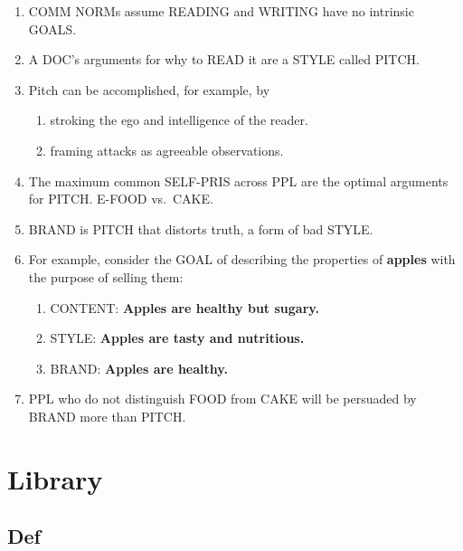 \documentclass[
]{book}
\providecommand{\tightlist}{%
  \setlength{\itemsep}{0pt}\setlength{\parskip}{0pt}}
\begin{document}
\begin{enumerate}
\def\labelenumi{\arabic{enumi}.}
\setcounter{enumi}{63}
\tightlist
\item
  COMM NORMs assume READING and WRITING have no intrinsic GOALS.
\item
  A DOC's arguments for why to READ it are a STYLE called PITCH.
\item
  Pitch can be accomplished, for example, by

  \begin{enumerate}
  \def\labelenumii{\arabic{enumii}.}
  \tightlist
  \item
    stroking the ego and intelligence of the reader.
  \item
    framing attacks as agreeable observations.
  \end{enumerate}
\item
  The maximum common SELF-PRIS across PPL are the optimal
  arguments for PITCH. E-FOOD vs.~CAKE.
\item
  BRAND is PITCH that distorts truth, a form of bad STYLE.
\item
  For example, consider the GOAL of describing the properties of \textbf{apples } with the purpose of selling them:

  \begin{enumerate}
  \def\labelenumii{\arabic{enumii}.}
  \tightlist
  \item
    CONTENT: \textbf{Apples are healthy but sugary. }\\
  \item
    STYLE: \textbf{Apples are tasty and nutritious. }\\
  \item
    BRAND: \textbf{Apples are healthy.}\\
  \end{enumerate}
\item
  PPL who do not distinguish FOOD from CAKE will be persuaded by BRAND more than PITCH.
\end{enumerate}

\hypertarget{library}{%
\section{Library}\label{library}}

\hypertarget{def}{%
\subsection{Def}\label{def}}
\end{document}
